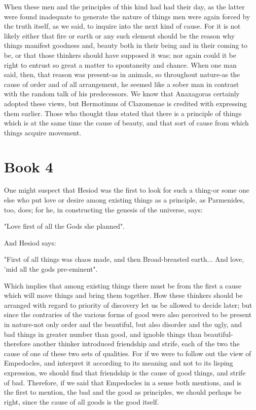 \documentclass[oneside, 17pt, dvipsnames]{extbook}
\begin{document}
When these men and the principles of this kind had had their day, as the latter were found inadequate to generate the nature of things men were again forced by the truth itself, as we said, to inquire into the next kind of cause. For it is not likely either that fire or earth or any such element should be the reason why things manifest goodness and, beauty both in their being and in their coming to be, or that those thinkers should have supposed it was; nor again could it be right to entrust so great a matter to spontaneity and chance. When one man said, then, that reason was present-as in animals, so throughout nature-as the cause of order and of all arrangement, he seemed like a sober man in contrast with the random talk of his predecessors. We know that Anaxagoras certainly adopted these views, but Hermotimus of Clazomenae is credited with expressing them earlier. Those who thought thus stated that there is a principle of things which is at the same time the cause of beauty, and that sort of cause from which things acquire movement.





\newpage
\section{Book 4}

One might suspect that Hesiod was the first to look for such a thing-or some one else who put love or desire among existing things as a principle, as Parmenides, too, does; for he, in constructing the genesis of the universe, says:

"Love first of all the Gods she planned".

And Hesiod says:

"First of all things was chaos made, and then Broad-breasted earth... And love, 'mid all the gods pre-eminent".

Which implies that among existing things there must be from the first a cause which will move things and bring them together. How these thinkers should be arranged with regard to priority of discovery let us be allowed to decide later; but since the contraries of the various forms of good were also perceived to be present in nature-not only order and the beautiful, but also disorder and the ugly, and bad things in greater number than good, and ignoble things than beautiful-therefore another thinker introduced friendship and strife, each of the two the cause of one of these two sets of qualities. For if we were to follow out the view of Empedocles, and interpret it according to its meaning and not to its lisping expression, we should find that friendship is the cause of good things, and strife of bad. Therefore, if we said that Empedocles in a sense both mentions, and is the first to mention, the bad and the good as principles, we should perhaps be right, since the cause of all goods is the good itself.
\end{document}
